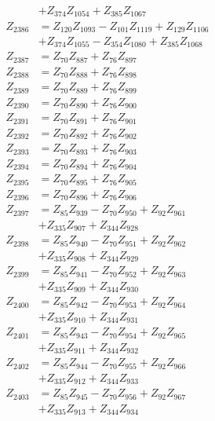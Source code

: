 \begin{multicols}{2}
\begin{align}
&+ Z_{374}Z_{1054} + Z_{385}Z_{1067} \nonumber \\
Z_{2386} &= Z_{120}Z_{1093} - Z_{101}Z_{1119} + Z_{129}Z_{1106}  \nonumber \\
&+ Z_{374}Z_{1055} - Z_{354}Z_{1080} + Z_{385}Z_{1068} \nonumber \\
Z_{2387} &= Z_{70}Z_{887} + Z_{76}Z_{897} \nonumber \\
Z_{2388} &= Z_{70}Z_{888} + Z_{76}Z_{898} \nonumber \\
Z_{2389} &= Z_{70}Z_{889} + Z_{76}Z_{899} \nonumber \\
Z_{2390} &= Z_{70}Z_{890} + Z_{76}Z_{900} \nonumber \\
Z_{2391} &= Z_{70}Z_{891} + Z_{76}Z_{901} \nonumber \\
Z_{2392} &= Z_{70}Z_{892} + Z_{76}Z_{902} \nonumber \\
Z_{2393} &= Z_{70}Z_{893} + Z_{76}Z_{903} \nonumber \\
Z_{2394} &= Z_{70}Z_{894} + Z_{76}Z_{904} \nonumber \\
Z_{2395} &= Z_{70}Z_{895} + Z_{76}Z_{905} \nonumber \\
Z_{2396} &= Z_{70}Z_{896} + Z_{76}Z_{906} \nonumber \\
Z_{2397} &= Z_{85}Z_{939} - Z_{70}Z_{950} + Z_{92}Z_{961}  \nonumber \\
&+ Z_{335}Z_{907} + Z_{344}Z_{928} \nonumber \\
Z_{2398} &= Z_{85}Z_{940} - Z_{70}Z_{951} + Z_{92}Z_{962}  \nonumber \\
&+ Z_{335}Z_{908} + Z_{344}Z_{929} \nonumber \\
Z_{2399} &= Z_{85}Z_{941} - Z_{70}Z_{952} + Z_{92}Z_{963}  \nonumber \\
&+ Z_{335}Z_{909} + Z_{344}Z_{930} \nonumber \\
Z_{2400} &= Z_{85}Z_{942} - Z_{70}Z_{953} + Z_{92}Z_{964}  \nonumber \\
&+ Z_{335}Z_{910} + Z_{344}Z_{931} \nonumber \\
Z_{2401} &= Z_{85}Z_{943} - Z_{70}Z_{954} + Z_{92}Z_{965}  \nonumber \\
&+ Z_{335}Z_{911} + Z_{344}Z_{932} \nonumber \\
Z_{2402} &= Z_{85}Z_{944} - Z_{70}Z_{955} + Z_{92}Z_{966}  \nonumber \\
&+ Z_{335}Z_{912} + Z_{344}Z_{933} \nonumber \\
Z_{2403} &= Z_{85}Z_{945} - Z_{70}Z_{956} + Z_{92}Z_{967}  \nonumber \\
&+ Z_{335}Z_{913} + Z_{344}Z_{934} \nonumber \\

\end{align}
\end{multicols}
